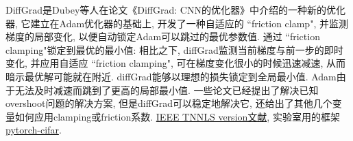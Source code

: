 DiffGrad是Dubey等人在论文《DiffGrad: CNN的优化器》中介绍的一种新的优化器, 它建立在Adam优化器的基础上, 开发了一种自适应的 ``friction clamp", 并监测梯度的局部变化, 以便自动锁定Adam可以跳过的最优参数值.
通过 ``friction clamping"锁定到最优的最小值: 相比之下, diffGrad监测当前梯度与前一步的即时变化, 并应用自适应 ``friction clamping", 可在梯度变化很小的时候迅速减速, 从而暗示最优解可能就在附近.
diffGrad能够以理想的损失锁定到全局最小值. Adam由于无法及时减速而跳到了更高的局部最小值.
一些论文已经提出了解决已知overshoot问题的解决方案, 但是diffGrad可以稳定地解决它, 还给出了其他几个变量如何应用clamping或friction系数.
\href{https://ieeexplore.ieee.org/document/8939562}{IEEE TNNLS version文献}, 实验室用的框架 \href{https://github.com/kuangliu/pytorch-cifar}{pytorch-cifar}.
